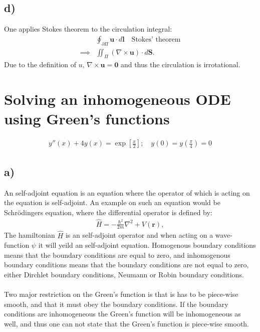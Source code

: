 \documentclass{article}
\begin{document}
\subsection*{d)}
One applies Stokes theorem to the circulation integral:
\begin{align*}
    &\oint_{\partial \Pi} \mathbf{u}\cdot d\mathbf{l}\quad \text{Stokes' theorem}\\
    \implies &\iint_{\Pi} (\nabla\times \mathbf{u})\cdot d\mathbf{S}.
\end{align*}Due to the definition of $u$, $\nabla \times \mathbf{u}=\mathbf{0}$ and thus the circulation is irrotational.

\newpage
\section{Solving an inhomogeneous ODE using Green’s functions}
\begin{align}
    y''(x) + 4y(x) =\exp\left[\frac{x}{2}\right]; \quad y(0) = y\left(\frac{\pi}{4}\right) = 0\label{eq: Task 4}
\end{align}
\subsection*{a)}
An self-adjoint equation is an equation where the operator of which is acting on the equation is self-adjoint. An example on such an equation would be Schrödingers equation, where the differential operator is defined by:
\begin{align*}
    \hat{H} = -\frac{\hbar^2}{2m}\nabla^2 + V(\mathbf{r}),
\end{align*}The hamiltonian $\hat{H}$ is an self-adjoint operator and when acting on a wave-function $\psi$ it will yeild an self-adjoint equation. Homogenous boundary conditions means that the boundary conditions are equal to zero, and inhomogenous boundary conditions means that the boundary conditions are not equal to zero, either Dirchlet boundary conditions, Neumann or Robin boundary conditions.\\\\
\noindent
Two major restriction on the Green's function is that is has to be piece-wise smooth, and that it must obey the boundary conditions. If the boundary conditions are inhomogeneous the Green's function will be inhomogeneous as well, and thus one can not state
that the Green's function is piece-wise smooth.
\end{document}
